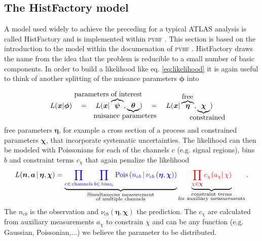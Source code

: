 \subsection{The HistFactory model}

A model used widely to achieve the preceding for a typical ATLAS analysis is called HistFactory \citep{cranmer2012histfactory} and is implemented within \textsc{pyhf} \citep{heinrich2021pyhf}. This section is based on the introduction to the model within the documenation of \textsc{pyhf} \citep{pyhf_intro}. HistFactory draws the name from the idea that the problem is reducible to a small number of basic components. In order to build a likelihood like eq. \ref{eq:likelihood} it is again useful to think of another splitting of the nuisance parameters $\bm{\phi}$ into

\newcommand{\freeset}{\bm{\eta}}
\newcommand{\constrset}{\bm{\chi}}
\newcommand{\singleconstr}{\chi}
\newcommand{\channelcounts}{\bm{n}}
\newcommand{\auxdata}{\bm{a}}
\newcommand{\poiset}{\bm{\psi}}
\newcommand{\nuisset}{\bm{\theta}}
\newcommand{\fullset}{\bm{\phi}}
\newcommand{\singlefull}{\phi}


\begin{equation}
 L(\bm{x}|\fullset) \quad=\quad
 L(\bm{x}|\overbrace{\poiset}^{\llap{\text{parameters of interest}}},\underbrace{\nuisset}_{\llap{\text{nuisance parameters}}}) \quad=\quad
 L(\bm{x}|\overbrace{\freeset}^{\rlap{\text{free}}},\underbrace{\constrset}_{\rlap{\text{constrained}}}) 
\end{equation}
free parameters $\freeset$, for example a cross section of a process and constrained parameters $\constrset$, that incorporate systematic uncertainties. The likelihood can then be modeled with Poissonians for each of the channels $c$ (e.g. signal regions), bins $b$ and constraint terms $c_{\singleconstr}$ that again penalize the likelihood
\begin{equation}
L(\channelcounts, \auxdata \,|\,\freeset,\constrset) = \underbrace{\color{blue}{\prod_{c\in\mathrm{\,channels}} \prod_{b \in \mathrm{\,bins}_c}\textrm{Pois}\left(n_{cb} \,\middle|\, \nu_{cb}\left(\freeset,\constrset\right)\right)}}_{\substack{\text{Simultaneous measurement}\\%
\text{of multiple channels}}} \underbrace{\color{red}{\prod_{\singleconstr \in \constrset} c_{\singleconstr}(a_{\singleconstr} |\, \singleconstr)}}_{\substack{\text{constraint terms}\\%
\text{for }\text{auxiliary measurements}}}.
\end{equation}
The $n_{cb}$ is the observation and $\nu_{cb}(\freeset,\constrset)$ the prediction. The $c_{\singleconstr}$ are calculated from auxiliary measurements $a_{\singleconstr}$ to constrain $\singleconstr$ and can be any function (e.g. Gaussian, Poissonian,...) we believe the parameter to be distributed. 

